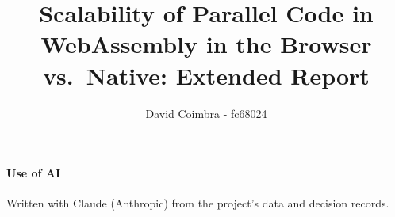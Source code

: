 \documentclass[acmsmall,nonacm,screen]{acmart}
\begin{document}
\setlength{\emergencystretch}{5em}

\title[Scalability of Parallel Code in WebAssembly vs.\ Native: Extended Report]{Scalability of Parallel Code in WebAssembly in the Browser vs.\ Native: Extended Report}

\author{David Coimbra - fc68024}




\maketitle

\tableofcontents





















\paragraph{Use of AI} Written with Claude (Anthropic) from the project's
data and decision records.




\appendix

\end{document}
